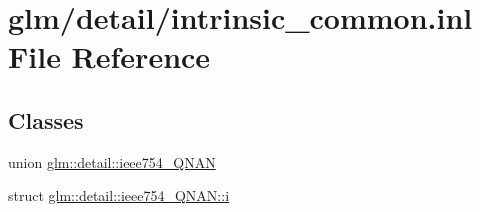 \hypertarget{intrinsic__common_8inl}{\section{glm/detail/intrinsic\-\_\-common.inl File Reference}
\label{intrinsic__common_8inl}
}
\subsection*{Classes}
\begin{DoxyCompactItemize}
\item 
union \hyperlink{unionglm_1_1detail_1_1ieee754__QNAN}{glm\-::detail\-::ieee754\-\_\-\-Q\-N\-A\-N}
\item 
struct \hyperlink{structglm_1_1detail_1_1ieee754__QNAN_1_1i}{glm\-::detail\-::ieee754\-\_\-\-Q\-N\-A\-N\-::i}
\end{DoxyCompactItemize}

